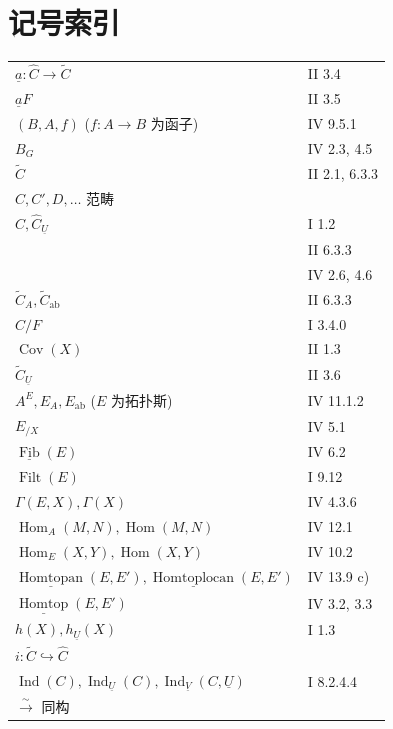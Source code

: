 \chapter*{记号索引}
\begingroup
\small
\setlength{\LTleft}{0pt}
\setlength{\LTright}{0pt}
\begin{longtable}{@{}p{.68\linewidth}p{.27\linewidth}@{}}
$\underline a:\widehat C\longrightarrow\widetilde C$ & II 3.4\\
$\underline a F$ & II 3.5\\
$(B,A,f)$ ($f:A\longrightarrow B$ 为函子) & IV 9.5.1\\
$B_G$ & IV 2.3, 4.5\\
$\widetilde C$ & II 2.1, 6.3.3\\
$C,C',D,\ldots$ 范畴 & \\
$\widehat C,\widehat C_{\underline U}$ & I 1.2\\
& II 6.3.3\\
& IV 2.6, 4.6\\
$\widetilde C_A,\widetilde C_{\mathrm{ab}}$ & II 6.3.3\\
$C/F$ & I 3.4.0\\
$\operatorname{Cov}(X)$ & II 1.3\\
$\widetilde C_{\underline U}$ & II 3.6\\
$A^E,E_A,E_{\mathrm{ab}}$ ($E$ 为拓扑斯) & IV 11.1.2\\
$E_{/X}$ & IV 5.1\\
$\underline{\operatorname{Fib}}(E)$ & IV 6.2\\
$\operatorname{Filt}(E)$ & I 9.12\\
$\Gamma(E,X),\Gamma(X)$ & IV 4.3.6\\
$\operatorname{Hom}_A(M,N),\operatorname{Hom}(M,N)$ & IV 12.1\\
$\operatorname{Hom}_E(X,Y),\operatorname{Hom}(X,Y)$ & IV 10.2\\
$\underline{\operatorname{Homtopan}}(E,E'),\underline{\operatorname{Homtoplocan}}(E,E')$ & IV 13.9 c)\\
$\underline{\operatorname{Homtop}}(E,E')$ & IV 3.2, 3.3\\
$h(X),h_{\underline U}(X)$ & I 1.3\\
$i:\widetilde C\hookrightarrow\widehat C$ & \\
$\operatorname{Ind}(C),\operatorname{Ind}_{\underline U}(C),\operatorname{Ind}_{\underline V}(C,\underline U)$ & I 8.2.4.4\\
$\xrightarrow{\sim}$ 同构 & \\

\end{longtable}
